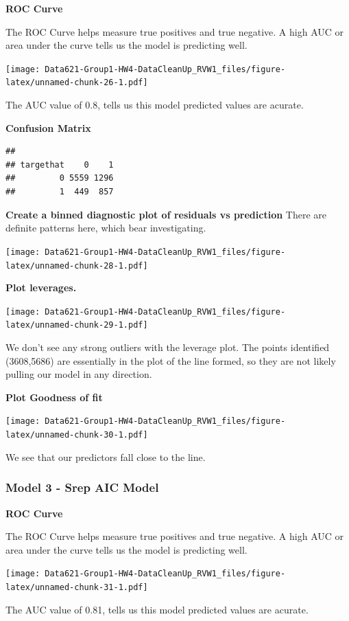 \documentclass[]{article}
\begin{document}
\textbf{ROC Curve}

The ROC Curve helps measure true positives and true negative. A high AUC
or area under the curve tells us the model is predicting well.

\texttt{[image: Data621-Group1-HW4-DataCleanUp\_RVW1\_files/figure-latex/unnamed-chunk-26-1.pdf]}

The AUC value of 0.8, tells us this model predicted values are acurate.

\textbf{Confusion Matrix}

\begin{verbatim}
##          
## targethat    0    1
##         0 5559 1296
##         1  449  857
\end{verbatim}

\textbf{Create a binned diagnostic plot of residuals vs prediction}
There are definite patterns here, which bear investigating.

\texttt{[image: Data621-Group1-HW4-DataCleanUp\_RVW1\_files/figure-latex/unnamed-chunk-28-1.pdf]}

\textbf{Plot leverages.}

\texttt{[image: Data621-Group1-HW4-DataCleanUp\_RVW1\_files/figure-latex/unnamed-chunk-29-1.pdf]}

We don't see any strong outliers with the leverage plot. The points
identified (3608,5686) are essentially in the plot of the line formed,
so they are not likely pulling our model in any direction.

\textbf{Plot Goodness of fit}

\texttt{[image: Data621-Group1-HW4-DataCleanUp\_RVW1\_files/figure-latex/unnamed-chunk-30-1.pdf]}

We see that our predictors fall close to the line.

\subsubsection{Model 3 - Srep AIC Model}\label{model-3---srep-aic-model}

\textbf{ROC Curve}

The ROC Curve helps measure true positives and true negative. A high AUC
or area under the curve tells us the model is predicting well.

\texttt{[image: Data621-Group1-HW4-DataCleanUp\_RVW1\_files/figure-latex/unnamed-chunk-31-1.pdf]}

The AUC value of 0.81, tells us this model predicted values are acurate.
\end{document}
